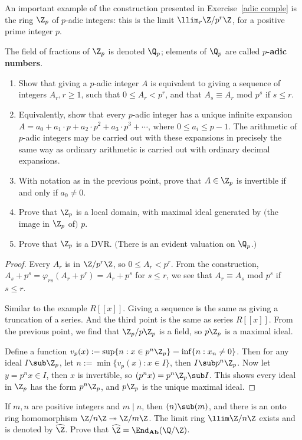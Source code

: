 \begin{exercise}
An important example of the construction presented in Exercise~\ref{adic comple} is the ring $\Z_p$ of $p$-adic integers: this is the limit $\llim_r\Z/p^r\Z$, for a positive prime integer $p$.\par
The field of fractions of $\Z_p$ is denoted $\Q_p$; elements of $\Q_p$ are called \textbf{$p$-adic numbers}.
\begin{enumerate}
\item Show that giving a $p$-adic integer $A$ is equivalent to giving a sequence of integers $A_r, r\geq 1$, such that $0\leq A_r<p^r$, and that $A_s\equiv A_r$ mod $p^s$ if $s\leq r$.
\item Equivalently, show that every $p$-adic integer has a unique infinite expansion $A=a_0+a_1\cdot p+a_2\cdot p^2+a_3\cdot p^3+\cdots$, where $0\leq a_i\leq p-1$. The arithmetic of $p$-adic integers may be carried out with these expansions in precisely the same way as ordinary arithmetic is carried out with ordinary decimal expansions.
\item With notation as in the previous point, prove that $A\in\Z_p$ is invertible if and only if $a_0\neq 0$.
\item Prove that $\Z_p$ is a local domain, with maximal ideal generated by $($the image in $\Z_p$ of$)$ $p$.
\item Prove that $\Z_p$ is a DVR. $($There is an evident valuation on $\Q_p$.$)$
\end{enumerate}
\end{exercise}
\begin{proof}
Every $A_r$ is in $\Z/p^r\Z$, so $0\leq A_r<p^r$. From the construction, $A_s+p^s=\varphi_{rs}(A_r+p^r)=A_r+p^s$ for $s\leq r$, we see that $A_r\equiv A_s$ mod $p^s$ if $s\leq r$.\par
Similar to the example $R[[x]]$. Giving a sequence is the same as giving a truncation of a series. And the third point is the same as series $R[[x]]$. From the previous point, we find that $\Z_p/p\Z_p$ is a field, so $p\Z_p$ is a maximal ideal.\par
Define a function $v_p(x):=\sup\{n:x\in p^n\Z_p\}=\inf\{n:x_n\neq 0\}$. Then for any ideal $I\sub\Z_p$, let $n:=\min\{v_p(x):x\in I\}$, then $I\sub p^n\Z_p$. Now let $y=p^nx\in I$, then $x$ is invertible, so $(p^nx)=p^n\Z_p\sub I$. This shows every ideal in $\Z_p$ has the form $p^n\Z_p$, and $p\Z_p$ is the unique maximal ideal.
\end{proof}
\begin{exercise}\label{completion of Z}
If $m,n$ are positive integers and $m\mid n$, then $(n)\sub (m)$, and there is an onto ring homomorphism $\Z/n\Z\twoheadrightarrow\Z/m\Z$. The limit ring $\llim\Z/n\Z$ exists and is denoted by $\widehat{\Z}$. Prove that $\widehat{\Z}=\End_{\mathbf{Ab}}(\Q/\Z)$. 
\end{exercise}
